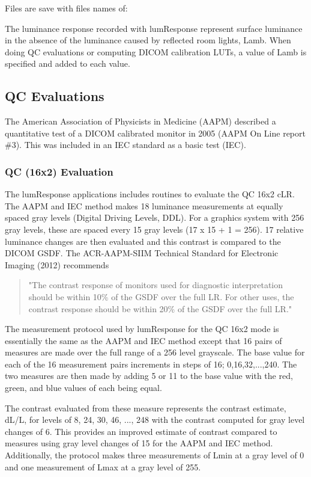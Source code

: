 Files are save with files names of:

The luminance response recorded with lumResponse represent surface luminance in the absence of the luminance caused by reflected room lights, Lamb. When doing QC evaluations or computing DICOM calibration LUTs, a value of Lamb is specified and added to each value. 

\subsection{QC Evaluations}

The American Association of Physicists in Medicine (AAPM) described a quantitative test of a DICOM calibrated monitor in 2005 (AAPM On Line report \#3). This was included in an IEC standard as a basic test (IEC). 

\subsubsection{QC (16x2) Evaluation}

The lumResponse applications includes routines to evaluate the QC 16x2 cLR. The AAPM and IEC method makes 18 luminance measurements at equally spaced gray levels (Digital Driving Levels, DDL). For a graphics system with 256 gray levels, these are spaced every 15 gray levels (17 x 15 + 1 = 256). 17 relative luminance changes are then evaluated and this contrast is compared to the DICOM GSDF. The ACR-AAPM-SIIM Technical Standard for Electronic Imaging (2012) recommends
\begin{quote}
"The contrast response of monitors used for diagnostic interpretation should be within 10\% of the GSDF over the full LR. For other uses, the contrast response should be within 20\% of the GSDF over the full LR." 
\end{quote}

The measurement protocol used by lumResponse for the QC 16x2 mode is essentially the same as the AAPM and IEC method except that 16 pairs of measures are made over the full range of a 256 level grayscale. The base value for each of the 16 measurement pairs increments in steps of 16; 0,16,32,...,240. The two measures are then made by adding 5 or 11 to the base value with the red, green, and blue values of each being equal. 

The contrast evaluated from these measure represents the contrast estimate, dL/L, for levels of 8, 24, 30, 46, ..., 248 with the contrast computed for gray level changes of 6. This provides an improved estimate of contrast compared to measures using gray level changes of 15 for the AAPM and IEC method. Additionally, the protocol makes three measurements of Lmin at a gray level of 0 and one measurement of Lmax at a gray level of 255. 

